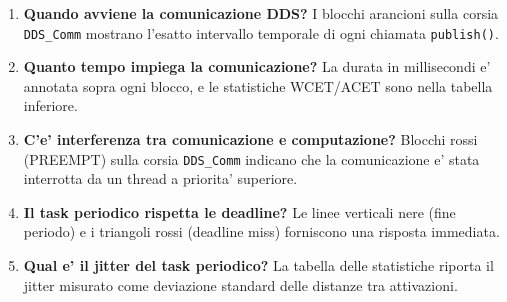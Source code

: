 \begin{enumerate}
    \item \textbf{Quando avviene la comunicazione DDS?}
          I blocchi arancioni sulla corsia \texttt{DDS\_Comm} mostrano
          l'esatto intervallo temporale di ogni chiamata \texttt{publish()}.
    \item \textbf{Quanto tempo impiega la comunicazione?}
          La durata in millisecondi e' annotata sopra ogni blocco,
          e le statistiche WCET/ACET sono nella tabella inferiore.
    \item \textbf{C'e' interferenza tra comunicazione e computazione?}
          Blocchi rossi (PREEMPT) sulla corsia \texttt{DDS\_Comm}
          indicano che la comunicazione e' stata interrotta da un thread
          a priorita' superiore.
    \item \textbf{Il task periodico rispetta le deadline?}
          Le linee verticali nere (fine periodo) e i triangoli rossi
          (deadline miss) forniscono una risposta immediata.
    \item \textbf{Qual e' il jitter del task periodico?}
          La tabella delle statistiche riporta il jitter misurato
          come deviazione standard delle distanze tra attivazioni.
\end{enumerate}
